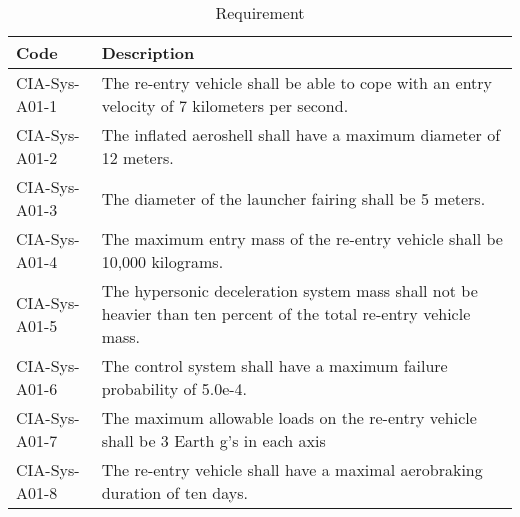 \begin{table}[H]
	\caption{Requirement}
	\resizebox{16cm}{!} {
    \begin{tabular}{|l|l|}
    \hline
    Code          & Description                                                                                                      \\ \hline \hline
    CIA-Sys-A01-1 & The re-entry vehicle shall be able to cope with an entry velocity of 7 kilometers per second.                \\ \hline
    CIA-Sys-A01-2 & The inflated aeroshell shall have a maximum diameter of 12 meters.                                               \\ \hline
    CIA-Sys-A01-3 & The diameter of the launcher fairing shall be 5 meters.                                                          \\ \hline
    CIA-Sys-A01-4 & The maximum entry mass of the re-entry vehicle shall be 10,000 kilograms.                                         \\ \hline
    CIA-Sys-A01-5 & The hypersonic deceleration system mass shall not be heavier than ten percent of the total re-entry vehicle mass. \\ \hline
    CIA-Sys-A01-6 & The control system shall have a maximum failure probability of 5.0e-4.                                           \\ \hline
    CIA-Sys-A01-7 & The maximum allowable loads on the re-entry vehicle shall be 3 Earth g's in each axis                            \\ \hline
    CIA-Sys-A01-8 & The re-entry vehicle shall have a maximal aerobraking duration of ten days.                                      \\ \hline
    \end{tabular}
    }
    \label{tab:requirements}
\end{table}

